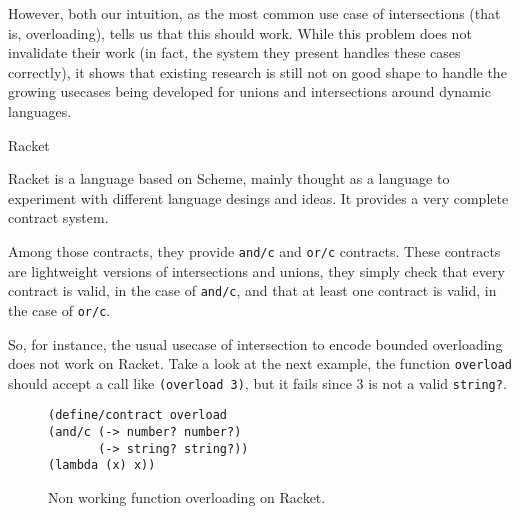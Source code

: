 \documentclass[sigplan,10pt,review,anonymous]{acmart}
\newcommand{\resolved}[2]{}
\newcommand{\racket}[1]{\lstinline[language=racket]{#1}}
\begin{document}
However, both our intuition, as the most common use case of intersections
(that is, overloading), tells us that this should work.
While this problem does not invalidate their work (in fact, the system they present
handles these cases correctly), it shows that existing research is still not on
good shape to handle the growing usecases being developed for
unions and intersections around dynamic languages.





\resolved{(Yann) Maybe adding a concrete example of this (it can be the same term but with
    concrete types like Number and String and simple contexts like application
    to a dumb argument) is sufficient to make the point}

\subsection{Racket}
\label{sec:racket}


Racket is a language based on Scheme, mainly thought as a language to experiment
with different language desings and ideas. It provides a very complete contract
system\cite{RacketContracts}.

Among those contracts, they provide \racket{and/c} and \racket{or/c} contracts.
These contracts are lightweight versions of intersections and unions, they simply
check that every contract is valid, in the case of \racket{and/c},
and that at least one contract
is valid, in the case of \racket{or/c}.

So, for instance, the usual usecase of intersection to encode bounded overloading
does not work on Racket. Take a look at the next example, the function
\racket{overload} should accept a call like \racket{(overload 3)}, but it fails
since 3 is not a valid \racket{string?}.

\begin{figure}[h]

\begin{lstlisting}[language=racket]
(define/contract overload
(and/c (-> number? number?)
       (-> string? string?))
(lambda (x) x))
\end{lstlisting}
\caption{Non working function overloading on Racket.}

\end{figure}
\end{document}
